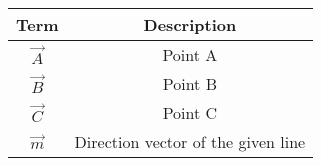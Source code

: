 \begin{tabular}[12ptx]{ |c| c|}
\hline\textbf{Term} & \textbf{Description}\\
\hline
$\vec{A}$&Point A \\
\hline
$\vec{B}$&Point B \\
\hline
$\vec{C}$&Point C \\
\hline
$\vec{m}$&Direction vector of the given line \\
\hline
\end{tabular}